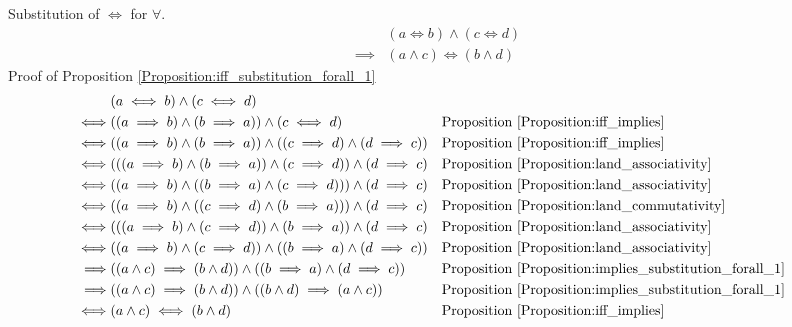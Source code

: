\begin{prop}
\label{Proposition:iff_substitution_forall_1}
Substitution of $\iff$ for $\forall$.
\begin{align*}
& (a \iff b) \land (c \iff d) \\
\implies & (a \land c) \iff (b \land d)
\end{align*}
Proof of Proposition \ref{Proposition:iff_substitution_forall_1}
\begin{align*}
& (a \iff b) \land (c \iff d) \\
\iff & ((a \implies b) \land (b \implies a)) \land (c \iff d)
& & \text{Proposition \ref{Proposition:iff_implies}} \\
\iff & ((a \implies b) \land (b \implies a)) \land ((c \implies d) \land (d \implies c))
& & \text{Proposition \ref{Proposition:iff_implies}} \\
\iff & (((a \implies b) \land (b \implies a)) \land (c \implies d)) \land (d \implies c)
& & \text{Proposition \ref{Proposition:land_associativity}} \\
\iff & ((a \implies b) \land ((b \implies a) \land (c \implies d))) \land (d \implies c)
& & \text{Proposition \ref{Proposition:land_associativity}} \\
\iff & ((a \implies b) \land ((c \implies d) \land (b \implies a))) \land (d \implies c)
& & \text{Proposition \ref{Proposition:land_commutativity}} \\
\iff & (((a \implies b) \land (c \implies d)) \land (b \implies a)) \land (d \implies c)
& & \text{Proposition \ref{Proposition:land_associativity}} \\
\iff & ((a \implies b) \land (c \implies d)) \land ((b \implies a) \land (d \implies c))
& & \text{Proposition \ref{Proposition:land_associativity}} \\
\implies & ((a \land c) \implies (b \land d)) \land ((b \implies a) \land (d \implies c))
& & \text{Proposition \ref{Proposition:implies_substitution_forall_1}} \\
\implies & ((a \land c) \implies (b \land d)) \land ((b \land d) \implies (a \land c))
& & \text{Proposition \ref{Proposition:implies_substitution_forall_1}} \\
\iff & (a \land c) \iff (b \land d)
& & \text{Proposition \ref{Proposition:iff_implies}} \\
\end{align*}
\end{prop}

